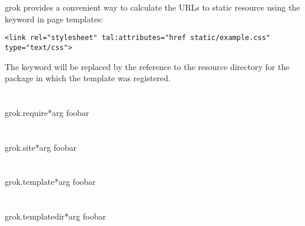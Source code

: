             grok provides a convenient way to calculate the URLs to static
            resource using the keyword  in page templates:

            \begin{verbatim}
<link rel="stylesheet" tal:attributes="href static/example.css" type="text/css">
            \end{verbatim}

            The keyword  will be replaced by the reference to
            the resource directory for the package in which the template was
            registered.

    \section{}

        \begin{funcdesc}{grok.require}{*arg}
        foobar
        \end{funcdesc}

    \section{}

        \begin{funcdesc}{grok.site}{*arg}
        foobar
        \end{funcdesc}

    \section{}

        \begin{funcdesc}{grok.template}{*arg}
        foobar
        \end{funcdesc}

    \section{}

        \begin{funcdesc}{grok.templatedir}{*arg}
        foobar
        \end{funcdesc}
